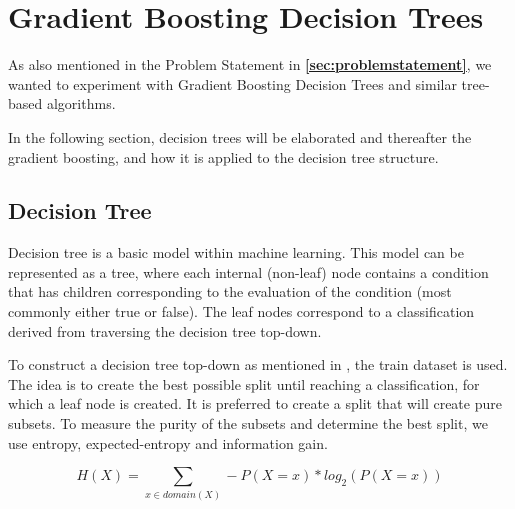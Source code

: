 \section{Gradient Boosting Decision Trees}
As also mentioned in the Problem Statement in \textbf{\autoref{sec:problemstatement}},
we wanted to experiment with Gradient Boosting Decision Trees and similar tree-based algorithms. %

In the following section, decision trees will be elaborated and thereafter the gradient boosting, and how it is applied to the decision tree structure.


\subsection{Decision Tree}
Decision tree is a basic model within machine learning. This model can be represented as a tree, where each internal (non-leaf) node contains a condition that has children corresponding to the evaluation of the condition (most commonly either true or false). The leaf nodes correspond to a classification derived from traversing the decision tree top-down.\cite{AIBook}

To construct a decision tree top-down as mentioned in \cite{AIBook}, the train dataset is used. The idea is to create the best possible split until reaching a classification, for which a leaf node is created. It is preferred to create a split that will create pure subsets. To measure the purity of the subsets and determine the best split, we use entropy, expected-entropy and information gain.

\begin{equation} \label{eq:entropy}
    H(X) = \sum_{x \in domain(X)} - P(X = x) * log_{2} (P(X = x))
\end{equation}

